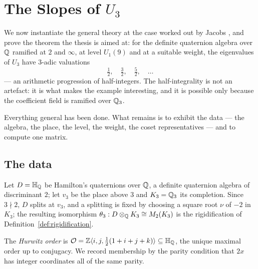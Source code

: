 \chapter{The Slopes of $U_3$}
\label{chap:jacobs}

We now instantiate the general theory at the case worked out by Jacobs \cite{Jacobs}, and prove
the theorem the thesis is aimed at: for the definite quaternion algebra over $\mathbb{Q}$ ramified at
$2$ and $\infty$, at level $U_1(9)$ and at a suitable weight, the eigenvalues of $U_3$ have
$3$-adic valuations
\[
  \tfrac12, \quad \tfrac32, \quad \tfrac52, \quad \dots
\]
--- an arithmetic progression of half-integers.  The half-integrality is not an artefact: it is
what makes the example interesting, and it is possible only because the coefficient field is
ramified over $\mathbb{Q}_3$.

Everything general has been done.  What remains is to exhibit the data --- the algebra, the
place, the level, the weight, the coset representatives --- and to compute one matrix.

\section{The data}

\begin{definition}
  \label{def:jacobs-setting}
  \leanok
  Let $D = \mathbb{H}_{\mathbb{Q}}$ be Hamilton's quaternions over $\mathbb{Q}$, a definite quaternion algebra of
  discriminant $2$; let $v_3$ be the place above $3$ and $K_3 = \mathbb{Q}_3$ its completion.  Since $3
  \nmid 2$, $D$ splits at $v_3$, and a splitting is fixed by choosing a square root $\nu$ of
  $-2$ in $K_3$; the resulting isomorphism $\theta_3 : D \otimes_{\mathbb{Q}} K_3 \cong M_2(K_3)$ is the
  rigidification of Definition~\ref{def:rigidification}.
\end{definition}


\begin{definition}
  \label{def:hurwitz}
  \leanok
  The \emph{Hurwitz order} is $\mathcal{O} = \mathbb{Z}\langle i, j, \tfrac12(1+i+j+k)\rangle \subseteq \mathbb{H}_{\mathbb{Q}}$,
  the unique maximal order up to conjugacy.  We record membership by the parity condition that
  $2x$ has integer coordinates all of the same parity.
\end{definition}

